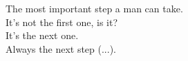 
%


        
\begin{ntquote}
  The most important step a man can take. \\It's not the first one, is it?\\
  It's the next one. \\Always the next step (...).
  
\end{ntquote}
